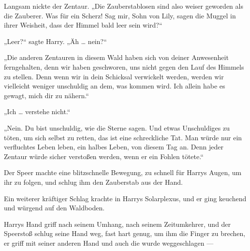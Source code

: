 Langsam nickte der Zentaur.
„Die Zauberstablosen sind also weiser geworden als die Zauberer. Was für ein Scherz! Sag mir, Sohn von Lily, sagen die Muggel in ihrer Weisheit, dass der Himmel bald leer sein wird?“

„Leer?“ sagte Harry. „Äh … nein?“

„Die anderen Zentauren in diesem Wald haben sich von deiner Anwesenheit ferngehalten, denn wir haben geschworen, uns nicht gegen den Lauf des Himmels zu stellen. Denn wenn wir in dein Schicksal verwickelt werden, werden wir vielleicht weniger unschuldig an dem, was kommen wird. Ich allein habe es gewagt, mich dir zu nähern.“

„Ich … verstehe nicht.“

„Nein. Du bist unschuldig, wie die Sterne sagen. Und etwas Unschuldiges zu töten, um sich selbst zu retten, das ist eine schreckliche Tat. Man würde nur ein verfluchtes Leben leben, ein halbes Leben, von diesem Tag an. Denn jeder Zentaur würde sicher verstoßen werden, wenn er ein Fohlen tötete.“

Der Speer machte eine blitzschnelle Bewegung, zu schnell für Harrys Augen, um ihr zu folgen, und schlug ihm den Zauberstab aus der Hand.

Ein weiterer kräftiger Schlag krachte in Harrys Solarplexus, und er ging keuchend und würgend auf den Waldboden.

Harrys Hand griff nach seinem Umhang, nach seinem Zeitumkehrer, und der Speerstoß schlug seine Hand weg, fast hart genug, um ihm die Finger zu brechen, er griff mit seiner anderen Hand und auch die wurde weggeschlagen —


